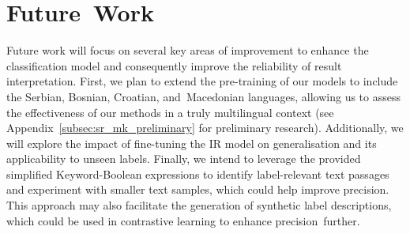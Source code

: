 \documentclass[make,article,accept,pdftex,moreauthors]{Definitions/mdpi}
\begin{document}
\section{Future~Work}
\label{sec:future}

Future work will focus on several key areas of improvement to enhance the classification model and consequently improve the reliability of result interpretation.
First, we plan to extend the pre-training of our models to include the Serbian, Bosnian, Croatian, and~Macedonian languages, allowing us to assess the effectiveness of our methods in a truly multilingual context (see Appendix~\ref{subsec:sr_mk_preliminary} for preliminary research).
Additionally, we will explore the impact of fine-tuning the IR model on generalisation and its applicability to unseen labels.
Finally, we intend to leverage the provided simplified Keyword-Boolean expressions to identify label-relevant text passages and experiment with smaller text samples, which could help improve precision.
This approach may also facilitate the generation of synthetic label descriptions, which could be used in contrastive learning to enhance precision~further. 

\vspace{6pt} 



\end{document}

